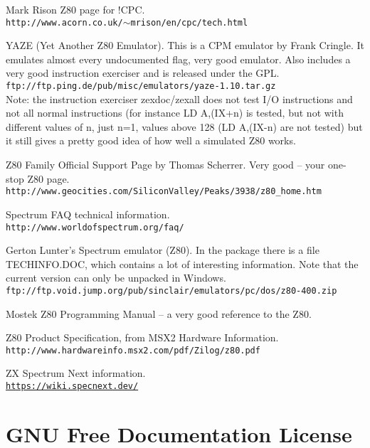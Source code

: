 \documentclass[12pt,twoside,openright,a4paper]{book}
\begin{document}
\begin{thebibliography}{}

	  Mark Rison Z80 page for !CPC. \\
	{\tt \small http://www.acorn.co.uk/$\sim$mrison/en/cpc/tech.html}

	 YAZE (Yet Another Z80 Emulator). This is a CPM emulator by Frank Cringle. It emulates almost every undocumented flag, very good emulator. Also includes a very good instruction exerciser and is released under the GPL. \\
	{\tt \small ftp://ftp.ping.de/pub/misc/emulators/yaze-1.10.tar.gz} \\
	Note: the instruction exerciser zexdoc/zexall does not test I/O instructions and not all normal instructions (for instance LD A,(IX+n) is tested, but not with different values of n, just n=1, values above 128 (LD A,(IX-n) are not tested) but it still gives a pretty good idea of how well a simulated Z80 works.

	 Z80 Family Official Support Page by Thomas Scherrer. Very good -- your one-stop Z80 page. \\
	{\tt \small http://www.geocities.com/SiliconValley/Peaks/3938/z80\_home.htm}

	 Spectrum FAQ technical information. \\
	{\tt \small http://www.worldofspectrum.org/faq/}

	 Gerton Lunter's Spectrum emulator (Z80). In the package there is a file TECHINFO.DOC, which contains a lot of interesting information. Note that the current version can only be unpacked in Windows. \\
	{\tt \small ftp://ftp.void.jump.org/pub/sinclair/emulators/pc/dos/z80-400.zip}

	 Mostek Z80 Programming Manual -- a very good reference to the Z80.

	 Z80 Product Specification, from MSX2 Hardware Information. \\
	{\tt \small http://www.hardwareinfo.msx2.com/pdf/Zilog/z80.pdf}

	 ZX Spectrum Next information. \\
	{\tt \small \url{https://wiki.specnext.dev/}}

\end{thebibliography}




\chapter{GNU Free Documentation License}
\label{gfdl}
\end{document}
